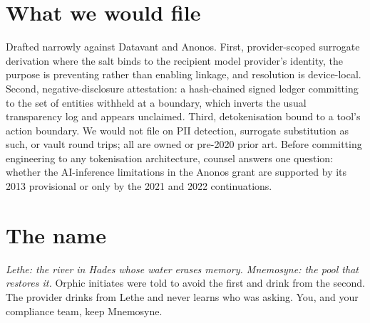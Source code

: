 \documentclass[9pt,twocolumn,a4paper]{extarticle}
\begin{document}
\section{What we would file}
\label{sec:file}
Drafted narrowly against Datavant and Anonos. First, provider-scoped surrogate derivation where the salt binds to the recipient model provider's identity, the purpose is preventing rather than enabling linkage, and resolution is device-local. Second, negative-disclosure attestation: a hash-chained signed ledger committing to the set of entities withheld at a boundary, which inverts the usual transparency log and appears unclaimed. Third, detokenisation bound to a tool's action boundary. We would not file on PII detection, surrogate substitution as such, or vault round trips; all are owned or pre-2020 prior art. Before committing engineering to any tokenisation architecture, counsel answers one question: whether the AI-inference limitations in the Anonos grant are supported by its 2013 provisional or only by the 2021 and 2022 continuations.

\section{The name}
\emph{Lethe: the river in Hades whose water erases memory. Mnemosyne: the pool that restores it.} Orphic initiates were told to avoid the first and drink from the second. The provider drinks from Lethe and never learns who was asking. You, and your compliance team, keep Mnemosyne.
\end{document}
